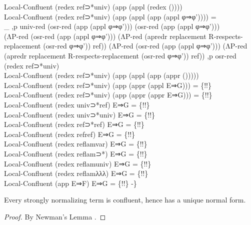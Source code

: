 {\begin{code}
{\>Local-Confluent (redex ref⊃*univ) (app (appl (redex ())))\<\\
\>Local-Confluent (redex ref⊃*univ) (app (appl (app (appl φ⇒φ')))) = \<\\
\>  \_ ,p univ-red (osr-red (app (appl φ⇒φ'))) (osr-red (app (appl φ⇒φ'))) \<\\
\>    (ΛP-red (osr-red (app (appl φ⇒φ'))) (ΛP-red (apredr replacement R-respects-replacement (osr-red φ⇒φ')) ref)) (ΛP-red (osr-red (app (appl φ⇒φ'))) (ΛP-red (apredr replacement R-respects-replacement (osr-red φ⇒φ')) ref)) ,p osr-red (redex ref⊃*univ)\<\\
\>Local-Confluent (redex ref⊃*univ) (app (appl (app (appr ()))))\<\\
\>Local-Confluent (redex ref⊃*univ) (app (appr (appl E⇒G))) = \{!!\}\<\\
\>Local-Confluent (redex ref⊃*univ) (app (appr (appr E⇒G))) = \{!!\}\<\\
\>Local-Confluent (redex univ⊃*ref) E⇒G = \{!!\}\<\\
\>Local-Confluent (redex univ⊃*univ) E⇒G = \{!!\}\<\\
\>Local-Confluent (redex ref⊃*ref) E⇒G = \{!!\}\<\\
\>Local-Confluent (redex refref) E⇒G = \{!!\}\<\\
\>Local-Confluent (redex reflamvar) E⇒G = \{!!\}\<\\
\>Local-Confluent (redex reflam⊃*) E⇒G = \{!!\}\<\\
\>Local-Confluent (redex reflamuniv) E⇒G = \{!!\}\<\\
\>Local-Confluent (redex reflamλλλ) E⇒G = \{!!\}\<\\
\>Local-Confluent (app E⇒F) E⇒G = \{!!\} -\}}\<%
\\
\>\<%
\end{code}
}

\begin{corollary}
Every strongly normalizing term is confluent, hence has a unique normal form.
\end{corollary}

\begin{proof}
By Newman's Lemma \cite{NewmansLemma}.
\end{proof}

